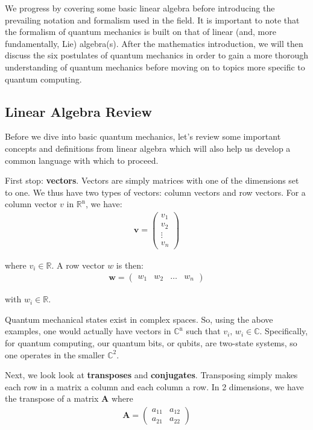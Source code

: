 \documentclass[11pt]{article} %
\begin{document}
We progress by covering some basic linear algebra before introducing the prevailing notation and formalism used in the field. It is important to note that the formalism of quantum mechanics is built on that of linear (and, more fundamentally, Lie) algebra(s). After the mathematics introduction, we will then discuss the six postulates of quantum mechanics in order to gain a more thorough understanding of quantum mechanics before moving on to topics more specific to quantum computing.

\subsection{Linear Algebra Review}
Before we dive into basic quantum mechanics, let's review some important concepts and definitions from linear algebra which will also help us develop a common language with which to proceed.

First stop: \textbf{vectors}. Vectors are simply matrices with one of the dimensions set to one. We thus have two types of vectors: column vectors and row vectors. For a column vector $v$ in $\mathbb{R}^\textrm{n}$, we have:
\begin{align}
    \textbf{v} =
    \begin{pmatrix}
        v_1 \\
        v_2 \\
        \vdots \\
        v_n
    \end{pmatrix} \nonumber
\end{align}

\noindent where $v_i \in \mathbb{R}$. A row vector $w$ is then:
\begin{align}
    \textbf{w} =
    \begin{pmatrix}
        w_1 & w_2 & \hdots & w_n
    \end{pmatrix} \nonumber
\end{align}

\noindent with $w_i \in \mathbb{R}$.

Quantum mechanical states exist in complex spaces. So, using the above examples, one would actually have vectors in $\mathbb{C}^\textrm{n}$ such that $v_i,\,w_i \in \mathbb{C}$. Specifically, for quantum computing, our quantum bits, or qubits, are two-state systems, so one operates in the smaller $\mathbb{C}^\textrm{2}$.

Next, we look look at \textbf{transposes} and \textbf{conjugates}. Transposing simply makes each row in a matrix a column and each column a row. In 2 dimensions, we have the transpose of a matrix \textbf{A} where
\begin{align}
    \textbf{A} =
    \begin{pmatrix}
        a_{11} & a_{12} \\
        a_{21} & a_{22}
    \end{pmatrix} \nonumber
\end{align}
\end{document}
